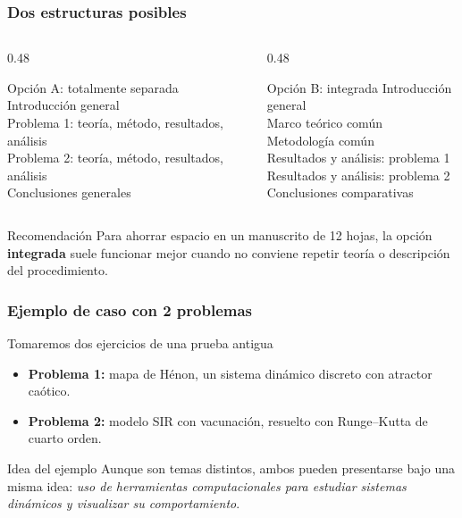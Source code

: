 \begin{frame}
\frametitle{Dos estructuras posibles}
\small
\begin{columns}[T]
\begin{column}{0.48\textwidth}
\begin{block}{Opci\'on A: totalmente separada}
Introducci\'on general\\
Problema 1: teor\'ia, m\'etodo, resultados, an\'alisis\\
Problema 2: teor\'ia, m\'etodo, resultados, an\'alisis\\
Conclusiones generales
\end{block}
\end{column}
\begin{column}{0.48\textwidth}
\begin{block}{Opci\'on B: integrada}
Introducci\'on general\\
Marco te\'orico com\'un\\
Metodolog\'ia com\'un\\
Resultados y an\'alisis: problema 1\\
Resultados y an\'alisis: problema 2\\
Conclusiones comparativas
\end{block}
\end{column}
\end{columns}

\vspace{0.15cm}
\begin{alertblock}{Recomendaci\'on}
Para ahorrar espacio en un manuscrito de 12 hojas, la opci\'on \textbf{integrada} suele funcionar mejor cuando no conviene repetir teor\'ia o descripci\'on del procedimiento.
\end{alertblock}
\end{frame}

\begin{frame}
\frametitle{Ejemplo de caso con 2 problemas}
\begin{block}{Tomaremos dos ejercicios de una prueba antigua}
\begin{itemize}
    \item \textbf{Problema 1:} mapa de H\'enon, un sistema din\'amico discreto con atractor ca\'otico.
    \item \textbf{Problema 2:} modelo SIR con vacunaci\'on, resuelto con Runge--Kutta de cuarto orden.
\end{itemize}
\end{block}

\vspace{0.15cm}
\begin{alertblock}{Idea del ejemplo}
Aunque son temas distintos, ambos pueden presentarse bajo una misma idea: \textit{uso de herramientas computacionales para estudiar sistemas din\'amicos y visualizar su comportamiento}.\end{alertblock}
\end{frame}

